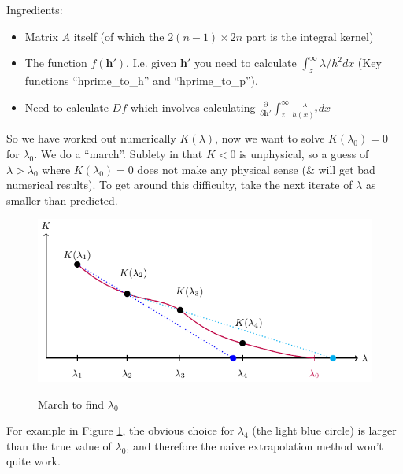 \documentclass{article}
\newcommand{\bs}{\boldsymbol}                               %
\begin{document}
Ingredients:
\begin{itemize}
\item Matrix $A$ itself (of which the $2(n-1)\times2n$ part is the integral
      kernel)
\item The function $f(\bs{h}')$. I.e. given $\bs{h}'$ you need to calculate
      $\int_z^{\infty}\lambda/h^2 dx$ (Key functions ``hprime\_to\_h'' and
      ``hprime\_to\_p'').
\item Need to calculate $Df$ which involves calculating $\displaystyle \frac
      {\partial} {\partial \bs{h}'} \int_z^{\infty} \frac{\lambda}{h(x)^2}dx$

\end{itemize}
So we have worked out numerically $K(\lambda)$, now we want to solve 
$K(\lambda_0)=0$ for $\lambda_0$. We do a ``march''. Sublety in that $K<0$ is 
unphysical, so a guess of $\lambda>\lambda_0$ where $K(\lambda_0)=0$ does
not make any physical sense (\& will get bad numerical results). To get 
around this difficulty, take the next iterate of $\lambda$ as smaller than
predicted.
\begin{figure}[!ht]\centering
\caption{March to find $\lambda_0$}
\includegraphics{NumFig1.pdf}\label{March}
\end{figure}

For example in Figure \ref{March}, the obvious choice for $\lambda_4$
(the light blue circle) is larger than the true value of $\lambda_0$, 
and therefore the naive extrapolation method won't quite work.
\end{document}
